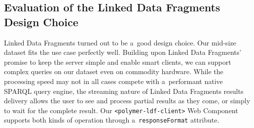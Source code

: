 \documentclass[runningheads,a4paper]{llncs}
\begin{document}

\subsection{Evaluation of the Linked Data Fragments Design Choice}

Linked Data Fragments turned out to be a~good design choice.
Our mid-size dataset fits the use case perfectly well.
Building upon Linked Data Fragments' promise to keep the server simple
and enable smart clients, we can support complex queries on our dataset
even on commodity hardware.
While the processing speed may not in all cases compete with a~performant
native SPARQL query engine, the streaming nature of Linked Data Fragments
results delivery allows the user to see and process partial results as they come,
or simply to wait for the complete result.
Our \texttt{<polymer-ldf-client>} Web Component supports both kinds of operation
through a~\texttt{responseFormat} attribute.
\end{document}

